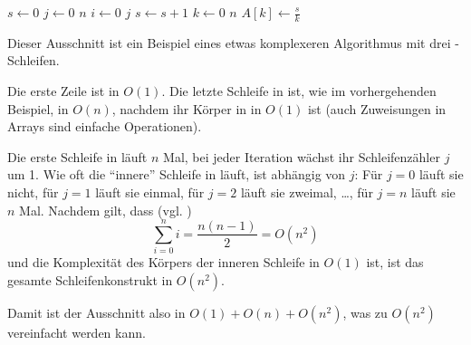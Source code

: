 \begin{codebox}
    \li $s \gets 0$                     \label{ln:ex3-setup}
    \li \For $j \gets 0$ \To $n$        \label{ln:ex3-outer-for}
    \li     \Do
                \For $i \gets 0$ \To $j$\label{ln:ex3-inner-for}
    \li             \Do
                        $s \gets s + 1$ \label{ln:ex3-inner-for-body}
                    \End
            \End
    \li \For $k \gets 0$ \To $n$        \label{ln:ex3-second-for}
    \li     \Do
                $A[k] \gets \frac{s}{k}$\label{ln:ex3-second-for-body}
            \End
\end{codebox}

Dieser Ausschnitt ist ein Beispiel eines etwas komplexeren Algorithmus mit drei \For-Schleifen.

Die erste Zeile ist in $O(1)$. Die letzte Schleife in  ist, wie im vorhergehenden Beispiel, in $O(n)$, nachdem ihr Körper in  in $O(1)$ ist (auch Zuweisungen in Arrays sind einfache Operationen).

Die erste Schleife in  läuft $n$ Mal, bei jeder Iteration wächst ihr Schleifenzähler $j$ um 1. Wie oft die \enquote{innere} Schleife in  läuft, ist abhängig von $j$: Für $j = 0$ läuft sie nicht, für $j = 1$ läuft sie einmal, für $j = 2$ läuft sie zweimal, \ldots, für $j = n$ läuft sie $n$ Mal. Nachdem gilt, dass (vgl. \cite{cf2007})
\begin{equation*}
    \sum_{i = 0}^{n} i = \frac{n(n - 1)}{2} = O(n^2)
\end{equation*}
und die Komplexität des Körpers der inneren Schleife in $O(1)$ ist, ist das gesamte Schleifenkonstrukt in $O(n^2)$.

Damit ist der Ausschnitt also in $O(1) + O(n) + O(n^2)$, was zu $O(n^2)$ vereinfacht werden kann.

